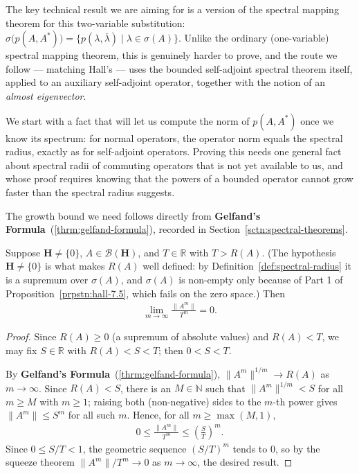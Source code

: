 The key technical result we are aiming for is a version of the spectral mapping theorem for this two-variable substitution: $\sigma\big(p(A,A^*)\big) = \big\{ p(\lambda,\overline\lambda) \mid \lambda \in \sigma(A) \big\}$. Unlike the ordinary (one-variable) spectral mapping theorem, this is genuinely harder to prove, and the route we follow — matching Hall's — uses the bounded self-adjoint spectral theorem itself, applied to an auxiliary self-adjoint operator, together with the notion of an \textit{almost eigenvector}.

We start with a fact that will let us compute the norm of $p(A,A^*)$ once we know its spectrum: for normal operators, the operator norm equals the spectral radius, exactly as for self-adjoint operators. Proving this needs one general fact about spectral radii of commuting operators that is not yet available to us, and whose proof requires knowing that the powers of a bounded operator cannot grow faster than the spectral radius suggests.

The growth bound we need follows directly from \textbf{Gelfand's Formula}~(\ref{thrm:gelfand-formula}), recorded in Section~\ref{sctn:spectral-theorems}.

\begin{lemma}
    \label{lmm:power-growth-controlled-by-spectral-radius}
    \leanok
    Suppose $\mathbf{H} \ne \{0\}$, $A \in \mathcal{B}(\mathbf{H})$, and $T \in \mathbb{R}$ with $T > R(A)$. (The hypothesis $\mathbf{H} \ne \{0\}$ is what makes $R(A)$ well defined: by Definition~\ref{def:spectral-radius} it is a supremum over $\sigma(A)$, and $\sigma(A)$ is non-empty only because of Part 1 of Proposition~\ref{prpstn:hall-7.5}, which fails on the zero space.) Then
    \begin{align}
        \lim_{m \to \infty} \frac{\|A^m\|}{T^m} = 0.
    \end{align}
\end{lemma}
\begin{proof}
    \leanok
Since $R(A) \ge 0$ (a supremum of absolute values) and $R(A) < T$, we may fix $S \in \mathbb{R}$ with $R(A) < S < T$; then $0 < S < T$.

By \textbf{Gelfand's Formula}~(\ref{thrm:gelfand-formula}), $\|A^m\|^{1/m} \rightarrow R(A)$ as $m \rightarrow \infty$. Since $R(A) < S$, there is an $M \in \mathbb{N}$ such that $\|A^m\|^{1/m} < S$ for all $m \ge M$ with $m \ge 1$; raising both (non-negative) sides to the $m$-th power gives $\|A^m\| \le S^m$ for all such $m$. Hence, for all $m \ge \max(M, 1)$,
\begin{align}
    0 \le \frac{\|A^m\|}{T^m} \le \left( \frac{S}{T} \right)^m.
\end{align}
Since $0 \le S/T < 1$, the geometric sequence $(S/T)^m$ tends to $0$, so by the squeeze theorem $\|A^m\|/T^m \rightarrow 0$ as $m \rightarrow \infty$, the desired result.
\end{proof}


